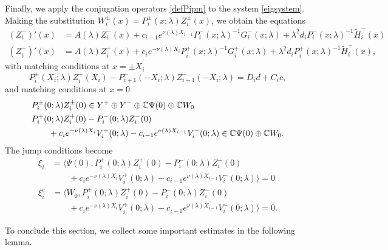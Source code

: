 \documentclass[12pt]{elsarticle}
\theoremstyle{plain}
\theoremstyle{definition}
\theoremstyle{remark}
\numberwithin{theorem}{section}
\numberwithin{equation}{section}
\begin{document}
Finally, we apply the conjugation operators \cref{defPipm} to the system \cref{eigsystem}. Making the substitution $W_i^\pm(x) = P_i^\pm(x; \lambda) Z_i^\pm(x)$, we obtain the equations
\begin{equation}\label{systemZ}
\begin{aligned}
(Z_i^-)'(x) &= A(\lambda) Z_i^-(x) + c_{i-1} e^{\nu(\lambda)X_{i-1}}  P_i^-(x; \lambda)^{-1} G_i^-(x; \lambda) + \lambda^2 d_i P_i^-(x; \lambda)^{-1} \tilde{H}_i^-(x) \\
(Z_i^+)'(x) &= A(\lambda) Z_i^+(x) + c_i e^{-\nu(\lambda)X_i}  P_i^+(x; \lambda)^{-1} G_i^+(x; \lambda) + \lambda^2 d_i P_i^+(x; \lambda)^{-1} \tilde{H}_i^+(x),
\end{aligned}
\end{equation}
with matching conditions at $x = \pm X_i$
\begin{equation}\label{systemmiddle}
P_i^+(X_i; \lambda) Z_i^+(X_i) - P_{i+1}^-(-X_i; \lambda) Z_{i+1}^-(-X_i; \lambda) = D_i d + C_i c, 
\end{equation}
and matching conditions at $x = 0$
\begin{equation}\label{systemcenter}
\begin{aligned}
&P_i^\pm(0; \lambda) Z_i^\pm(0) \in Y^+ \oplus Y^- \oplus \mathbb{C} \Psi(0) \oplus \mathbb{C} W_0 \\
&P_i^+(0; \lambda)Z_i^+(0) - P_i^-(0; \lambda) Z_i^-(0) \\
&\qquad+ c_i e^{-\nu(\lambda)X_i}V_i^+(0; \lambda) - c_{i-1} e^{\nu(\lambda)X_{i-1}} V_i^-(0; \lambda) \in \mathbb{C} \Psi(0) \oplus \mathbb{C} W_0.
\end{aligned}
\end{equation}
The jump conditions become
\begin{equation}\label{jumpcondZ}
\begin{aligned}
\xi_i &= \langle \Psi(0), P_i^+(0; \lambda) Z_i^+(0) - P_i^-(0; \lambda) Z_i^-(0) \\
&\qquad + c_i e^{-\nu(\lambda)X_i}V_i^+(0; \lambda) - c_{i-1} e^{\nu(\lambda)X_{i-1}} V_i^-(0; \lambda) \rangle = 0  \\
\xi_i^c &= \langle W_0, P_i^+(0; \lambda) Z_i^+(0) - P_i^-(0; \lambda) Z_i^-(0) \\
&\qquad + c_i e^{-\nu(\lambda)X_i}V_i^+(0; \lambda) - c_{i-1} e^{\nu(\lambda)X_{i-1}} V_i^-(0; \lambda) \rangle = 0. 
\end{aligned}
\end{equation}

To conclude this section, we collect some important estimates in the following lemma.
\end{document}
